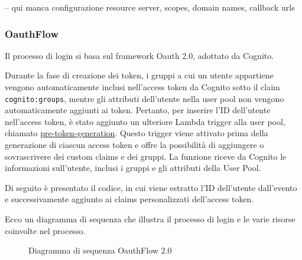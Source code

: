 -- qui manca configurazione resource server, scopes, domain names, callback urls

\subsubsection{OauthFlow}
Il processo di login si basa sul framework Oauth 2.0, adottato da Cognito.

Durante la fase di creazione dei token, i gruppi a cui un utente appartiene vengono automaticamente inclusi nell'access token da Cognito sotto il claim \texttt{cognito:groups}, mentre gli attributi dell'utente nella user pool non vengono automaticamente aggiunti ai token. Pertanto, per inserire l'ID dell'utente nell'access token, è stato aggiunto un ulteriore Lambda trigger alla user pool, chiamato \href{https://docs.aws.amazon.com/cognito/latest/developerguide/user-pool-lambda-pre-token-generation.html#user-pool-lambda-pre-token-generation-accesstoken}{pre-token-generation}. Questo trigger viene attivato prima della generazione di ciascun access token e offre la possibilità di aggiungere o sovrascrivere dei custom claims e dei gruppi. La funzione riceve da Cognito le informazioni sull'utente, inclusi i gruppi e gli attributi della User Pool. 

Di seguito è presentato il codice, in cui viene estratto l'ID dell'utente dall'evento e successivamente aggiunto ai claims personalizzati dell'access token.



Ecco un diagramma di sequenza che illustra il processo di login e le varie risorse coinvolte nel processo.

\begin{figure}[ht]
    \centering
    \caption{Diagramma di sequenza OauthFlow 2.0}
    \label{auth_sequence}
\end{figure}

